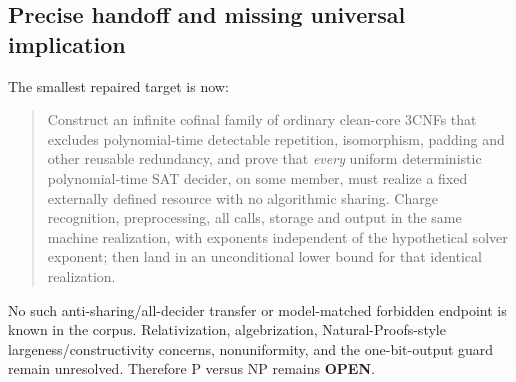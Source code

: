 \documentclass[11pt]{article}
\newcommand{\OPEN}{\textbf{OPEN}}
\begin{document}
\subsection*{Precise handoff and missing universal implication}

The smallest repaired target is now:
\begin{quote}
Construct an infinite cofinal family of ordinary clean-core 3CNFs that excludes
polynomial-time detectable repetition, isomorphism, padding and other reusable
redundancy, and prove that \emph{every} uniform deterministic polynomial-time
SAT decider, on some member, must realize a fixed externally defined resource
with no algorithmic sharing.  Charge recognition, preprocessing, all calls,
storage and output in the same machine realization, with exponents independent
of the hypothetical solver exponent; then land in an unconditional lower bound
for that identical realization.
\end{quote}
No such anti-sharing/all-decider transfer or model-matched forbidden endpoint
is known in the corpus.  Relativization, algebrization, Natural-Proofs-style
largeness/constructivity concerns, nonuniformity, and the one-bit-output guard
remain unresolved.  Therefore P versus NP remains \OPEN.
\end{document}
